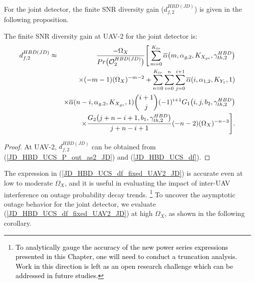 For the joint detector, the finite SNR diversity gain ($d_{f,2}^{HBD(JD)}$) is given in the following proposition.
\begin{proposition} 
The finite SNR diversity gain at UAV-2 for the joint detector is:
\begin{eqnarray} \label{JD_HBD_UCS_df_fixed_UAV2_JD}
d_{f,2}^{HBD(JD)} & \approx & \frac{-\Omega_X}{Pr\big(\mathcal{O}_{2}^{HBD(JD)}\big)} \Bigg[ \sum_{m=0}^{K_{tr}} \overline{\alpha}\big(m,\alpha_{g,2},K_{X_{gs}},\gamma_{th,2}^{HBD}\big) \nonumber\\
& & \hspace{-0cm} \times (-m-1) (\Omega_{X})^{-m-2} + \sum_{n=0}^{K_{tr}}\sum_{i=0}^{n}\sum_{j=0}^{i+1} \overline{\alpha}(i,\alpha_{1,2},K_{Y_1},1) \nonumber\\
& & \hspace{-0cm} \times \overline{\alpha}(n-i,\alpha_{g,2},K_{X_{gs}},1) \binom{i+1}{j}(-1)^{i+1} G_1\big(i,j,b_2,\gamma_{th,2}^{HBD}\big) \nonumber\\
& & \hspace{-0cm} \times \frac{G_2\big(j+n-i+1,b_1,\gamma_{th,2}^{HBD}\big)}{j+n-i+1} (-n-2)(\Omega_X)^{-n-3} \Bigg].
\end{eqnarray}
\end{proposition}
\begin{proof}
At UAV-2, $d_{f,2}^{HBD(JD)}$ can be obtained from (\ref{JD_HBD_UCS_P_out_as2_JD}) and (\ref{JD_HBD_UCS_df}).
\end{proof}

The expression in (\ref{JD_HBD_UCS_df_fixed_UAV2_JD}) is accurate even at low to moderate $\Omega_X$, and it is useful in evaluating the impact of inter-UAV interference on outage probability decay trends. \textcolor{black}{\footnote{\textcolor{black}{To analytically gauge the accuracy of the new power series expressions presented in this Chapter, one will need to conduct a truncation analysis. Work in this direction is left as an open research challenge which can be addressed in future studies.}}} To uncover the asymptotic outage behavior for the joint detector, we evaluate (\ref{JD_HBD_UCS_df_fixed_UAV2_JD}) at high $\Omega_X$, as shown in the following corollary.

